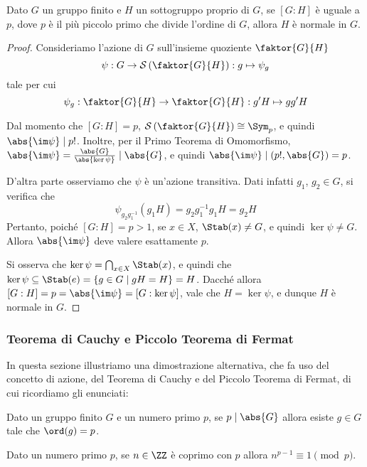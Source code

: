 \documentclass[11pt]{scrartcl}
\begin{document}
	\begin{proposition}
		Dato $G$ un gruppo finito e $H$ un sottogruppo proprio di $G$, se $[G:H]$ è uguale
		a $p$, dove
		$p$ è il più piccolo primo che divide l'ordine di $G$, allora $H$ è normale
		in $G$.
	\end{proposition}
	
	\begin{proof}
		Consideriamo l'azione di $G$ sull'insieme quoziente $\faktor{G}{H}$ 
		\[
		\psi: G \to \mathcal{S}\left(\faktor{G}{H}\right) : g \mapsto \psi_g
		\]
		tale per cui
		\[
		\psi_g : \faktor{G}{H} \to \faktor{G}{H} : g'H \mapsto gg'H
		\]
		
		Dal momento che $[G : H] = p$, $\mathcal{S}\left(\faktor{G}{H}\right) \cong \Sym_p$,
		e quindi $\abs{\im \psi} \mid p!$. Inoltre, per il Primo Teorema di Omomorfismo,
		$\abs{\im \psi} = \frac{\abs{G}}{\abs{\ker \psi}} \mid \abs{G}$, e quindi
		$\abs{\im \psi} \mid (p!, \abs{G}) = p$. \medskip
		

		D'altra parte osserviamo che $\psi$ è un'azione transitiva. Dati infatti
		$g_1$, $g_2 \in G$, si verifica che
		\[ \psi_{g_2 g_1^{-1}}(g_1H) = g_2g_1^{-1}g_1H = g_2H \]
		Pertanto, poiché $[G : H] = p > 1$, se $x \in X$, $\Stab(x) \neq G$, e quindi
		$\ker \psi \neq G$. Allora $\abs{\im \psi}$ deve valere esattamente $p$. \medskip
		
		
		Si osserva che $\ker \psi = \bigcap_{x \in X} \Stab(x)$, e quindi
		che $\ker \psi \subseteq \Stab(e) = \{g \in G \mid gH = H \} = H$.
		Dacché allora $[G : H] = p = \abs{\im \psi} = [G : \ker \psi]$, vale
		che $H = \ker \psi$, e dunque $H$ è normale in $G$.
	\end{proof}
	
	
	\subsubsection{Teorema di Cauchy e Piccolo Teorema di Fermat}
	
	In questa sezione illustriamo una dimostrazione alternativa, che fa uso del concetto di
	azione, del Teorema di Cauchy e del Piccolo
	Teorema di Fermat, di cui ricordiamo gli enunciati:
	
	\begin{theorem}
		\label{teorema1.44}
		Dato un gruppo finito $G$ e un numero primo $p$, se $p \mid \abs{G}$ allora esiste 
		$g \in G$ tale che $\ord(g) = p$.
	\end{theorem}
	
	\begin{theorem}
		\label{teorema1.45}
		Dato un numero primo $p$, se $n \in \ZZ$ è coprimo con $p$ allora 
		$n^{p - 1} \equiv 1 \pmod p$.
	\end{theorem}
	
\end{document}
